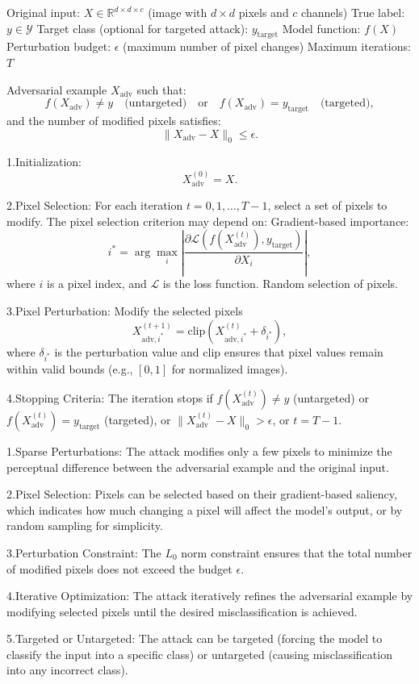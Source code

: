 
Original input: $X \in \mathbb{R}^{d \times d \times c}$ (image with $d \times d$ pixels and $c$ channels)
True label: $y \in \mathcal{Y}$
Target class (optional for targeted attack): $y_{\text{target}}$
Model function: $f(X)$
Perturbation budget: $\epsilon$ (maximum number of pixel changes)
Maximum iterations: $T$

Adversarial example $X_{\text{adv}}$ such that:
\[
f(X_{\text{adv}}) \neq y \quad \text{(untargeted)} \quad \text{or} \quad f(X_{\text{adv}}) = y_{\text{target}} \quad \text{(targeted)},
\]
and the number of modified pixels satisfies:
\[
\|X_{\text{adv}} - X\|_0 \leq \epsilon.
\]

1.Initialization:
   \[
   X_{\text{adv}}^{(0)} = X.
   \]

2.Pixel Selection:
For each iteration $t = 0, 1, \dots, T-1$, select a set of pixels to modify. The pixel selection criterion may depend on:
Gradient-based importance:
       \[
       i^* = \arg\max_i \left| \frac{\partial \mathcal{L}(f(X_{\text{adv}}^{(t)}), y_{\text{target}})}{\partial X_i} \right|,
       \]
where $i$ is a pixel index, and $\mathcal{L}$ is the loss function. Random selection of pixels.

3.Pixel Perturbation: Modify the selected pixels
   \[
   X_{\text{adv}, i^*}^{(t+1)} = \text{clip} \left( X_{\text{adv}, i^*}^{(t)} + \delta_{i^*} \right),
   \]
   where $\delta_{i^*}$ is the perturbation value and $\text{clip}$ ensures that pixel values remain within valid bounds (e.g., $[0, 1]$ for normalized images).

4.Stopping Criteria: The iteration stops if  $f(X_{\text{adv}}^{(t)}) \neq y$ (untargeted) or $f(X_{\text{adv}}^{(t)}) = y_{\text{target}}$ (targeted), or $\|X_{\text{adv}}^{(t)} - X\|_0 > \epsilon$, or $t = T-1$.

1.Sparse Perturbations: The attack modifies only a few pixels to minimize the perceptual difference between the adversarial example and the original input.

2.Pixel Selection: Pixels can be selected based on their gradient-based saliency, which indicates how much changing a pixel will affect the model's output, or by random sampling for simplicity.

3.Perturbation Constraint: The $L_0$ norm constraint ensures that the total number of modified pixels does not exceed the budget $\epsilon$.

4.Iterative Optimization: The attack iteratively refines the adversarial example by modifying selected pixels until the desired misclassification is achieved.

5.Targeted or Untargeted: The attack can be targeted (forcing the model to classify the input into a specific class) or untargeted (causing misclassification into any incorrect class).